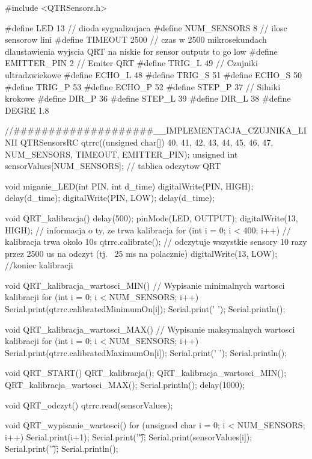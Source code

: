 #include <QTRSensors.h>

#define LED           13    // dioda sygnalizujaca
#define NUM_SENSORS   8     // ilosc sensorow lini
#define TIMEOUT       2500  // czas w 2500 mikrosekundach dlaustawienia wyjscia QRT na niskie for sensor outputs to go low
#define EMITTER_PIN   2     // Emiter QRT
#define TRIG_L        49    // Czujniki ultradzwiekowe
#define ECHO_L        48
#define TRIG_S        51
#define ECHO_S        50
#define TRIG_P        53
#define ECHO_P        52
#define STEP_P        37    // Silniki krokowe
#define DIR_P         36
#define STEP_L        39
#define DIR_L         38
#define DEGRE         1.8

//####################__IMPLEMENTACJA_CZUJNIKA_LINII
QTRSensorsRC qtrrc((unsigned char[]) {40, 41, 42, 43, 44, 45, 46, 47}, NUM_SENSORS, TIMEOUT, EMITTER_PIN); 
unsigned int sensorValues[NUM_SENSORS]; // tablica odczytow QRT

void miganie_LED(int PIN, int d_time) {
  digitalWrite(PIN, HIGH);
  delay(d_time);
  digitalWrite(PIN, LOW);
  delay(d_time);
}

void QRT_kalibracja(){
  delay(500);
  pinMode(LED, OUTPUT);
  digitalWrite(13, HIGH);        // informacja o ty, ze trwa kalibracja
  for (int i = 0; i < 400; i++)  // kalibracja trwa okolo 10s
    qtrrc.calibrate();           // odczytuje wszystkie sensory 10 razy przez 2500 us na odczyt (tj. ~25 ms na polacznie)
  digitalWrite(13, LOW);         //koniec kalibracji
}

void QRT_kalibracja_wartosci_MIN(){ // Wypisanie minimalnych wartosci kalibracji
   for (int i = 0; i < NUM_SENSORS; i++)
  {
    Serial.print(qtrrc.calibratedMinimumOn[i]);
    Serial.print(' ');
  }
  Serial.println();
}

void QRT_kalibracja_wartosci_MAX(){ // Wypisanie maksymalnych wartosci kalibracji
  for (int i = 0; i < NUM_SENSORS; i++)
  {
    Serial.print(qtrrc.calibratedMaximumOn[i]);
    Serial.print(' ');
  }
  Serial.println();
}

void QRT_START(){
  QRT_kalibracja();
  QRT_kalibracja_wartosci_MIN();
  QRT_kalibracja_wartosci_MAX();
  Serial.println();
  delay(1000);
}

void QRT_odczyt(){
  qtrrc.read(sensorValues);
}

void QRT_wypisanie_wartosci(){
  for (unsigned char i = 0; i < NUM_SENSORS; i++)
  {
    Serial.print(i+1);
    Serial.print('\t');
    Serial.print(sensorValues[i]);
    Serial.print('\t');
  }
  Serial.println();
}

